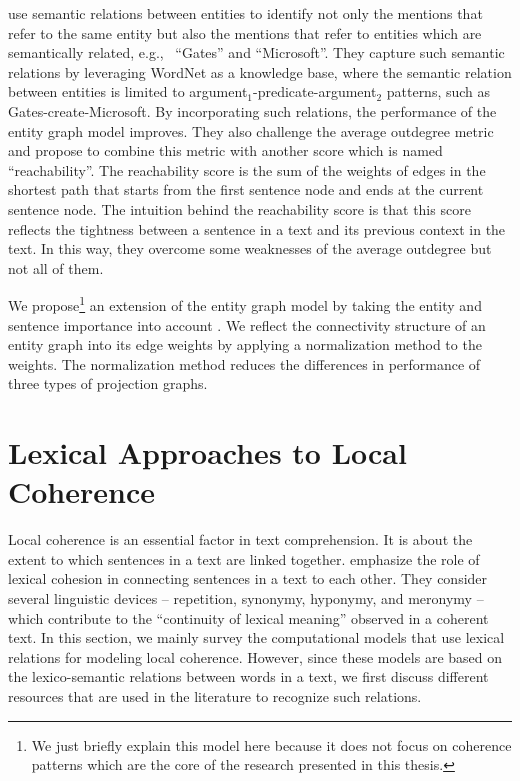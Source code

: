  use semantic relations between entities to identify not only the mentions that refer to the same entity but also the mentions that refer to entities which are semantically related, e.g., \ ``Gates'' and ``Microsoft''.  
They capture such semantic relations by leveraging WordNet \cite{baccianella10} as a knowledge base, where the semantic relation between entities is limited to argument$_1$-predicate-argument$_2$ patterns, such as \mbox{Gates-create-Microsoft}. 
By incorporating such relations, the performance of the entity graph model improves.  
They also challenge the average outdegree metric and propose to combine this metric with another score which is named ``reachability''. 
The reachability score is the sum of the weights of edges in the shortest path that starts from the first sentence node and ends at the current sentence node. 
The intuition behind the reachability score is that this score reflects the tightness between a sentence in a text and its previous context in the text. 
In this way, they overcome some weaknesses of the average outdegree but not all of them.    

We propose\footnote{We just briefly explain this model here because it does not focus on coherence patterns which are the core of the research presented in this thesis.} an extension of the entity graph model by taking the entity and sentence importance into account \cite{mesgar14}. 
We reflect the connectivity structure of an entity graph into its edge weights by applying a normalization method to the weights.  
The normalization method reduces the differences in performance of three types of projection graphs. 

\section{Lexical Approaches to Local Coherence}

Local coherence is an essential factor in text comprehension.
It is about the extent to which sentences in a text are linked together. 
 emphasize the role of lexical cohesion in connecting sentences in a text to each other. 
They consider several linguistic devices -- repetition, synonymy, hyponymy, and meronymy --  which contribute to the ``continuity of lexical meaning'' observed in a coherent text.   
In this section, we mainly survey the computational models that use lexical relations for modeling local coherence. 
However, since these models are based on the lexico-semantic relations between words in a text, we first discuss different resources that are used in the literature to recognize such relations. 


